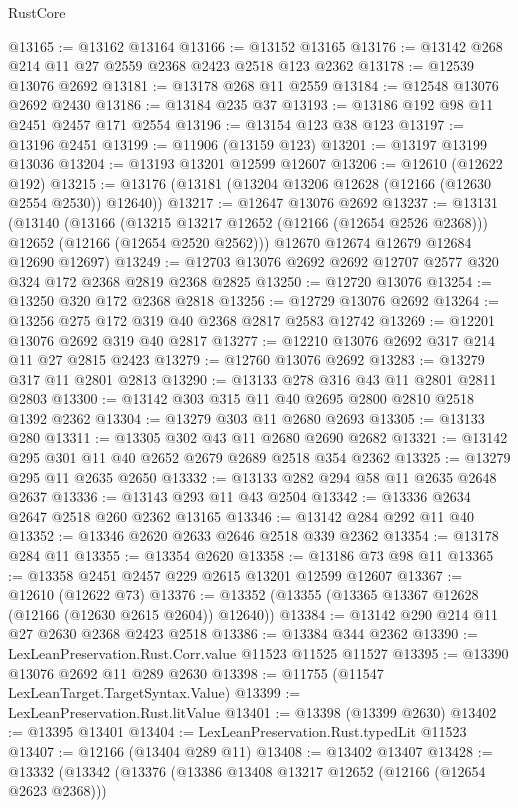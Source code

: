 \begin{lexlean}{RustCore}
\begin{coremodule}
@13165 := @13162 @13164
@13166 := @13152 @13165
@13176 := @13142 @268 @214 @11 @27 @2559 @2368 @2423 @2518 @123 @2362
@13178 := @12539 @13076 @2692
@13181 := @13178 @268 @11 @2559
@13184 := @12548 @13076 @2692 @2430
@13186 := @13184 @235 @37
@13193 := @13186 @192 @98 @11 @2451 @2457 @171 @2554
@13196 := @13154 @123 @38 @123
@13197 := @13196 @2451
@13199 := @11906 (@13159 @123)
@13201 := @13197 @13199 @13036
@13204 := @13193 @13201 @12599 @12607
@13206 := @12610 (@12622 @192)
@13215 := @13176 (@13181 (@13204 @13206 @12628 (@12166 (@12630 @2554 @2530)) @12640))
@13217 := @12647 @13076 @2692
@13237 := @13131
    (@13140
      (@13166
        (@13215 @13217 @12652 (@12166 (@12654 @2526 @2368)))
        @12652
        (@12166 (@12654 @2520 @2562)))
      @12670
      @12674
      @12679
      @12684
      @12690
      @12697)
@13249 := @12703 @13076 @2692 @2692 @12707 @2577 @320 @324 @172 @2368 @2819 @2368 @2825
@13250 := @12720 @13076
@13254 := @13250 @320 @172 @2368 @2818
@13256 := @12729 @13076 @2692
@13264 := @13256 @275 @172 @319 @40 @2368 @2817 @2583 @12742
@13269 := @12201 @13076 @2692 @319 @40 @2817
@13277 := @12210 @13076 @2692 @317 @214 @11 @27 @2815 @2423
@13279 := @12760 @13076 @2692
@13283 := @13279 @317 @11 @2801 @2813
@13290 := @13133 @278 @316 @43 @11 @2801 @2811 @2803
@13300 := @13142 @303 @315 @11 @40 @2695 @2800 @2810 @2518 @1392 @2362
@13304 := @13279 @303 @11 @2680 @2693
@13305 := @13133 @280
@13311 := @13305 @302 @43 @11 @2680 @2690 @2682
@13321 := @13142 @295 @301 @11 @40 @2652 @2679 @2689 @2518 @354 @2362
@13325 := @13279 @295 @11 @2635 @2650
@13332 := @13133 @282 @294 @58 @11 @2635 @2648 @2637
@13336 := @13143 @293 @11 @43 @2504
@13342 := @13336 @2634 @2647 @2518 @260 @2362 @13165
@13346 := @13142 @284 @292 @11 @40
@13352 := @13346 @2620 @2633 @2646 @2518 @339 @2362
@13354 := @13178 @284 @11
@13355 := @13354 @2620
@13358 := @13186 @73 @98 @11
@13365 := @13358 @2451 @2457 @229 @2615 @13201 @12599 @12607
@13367 := @12610 (@12622 @73)
@13376 := @13352 (@13355 (@13365 @13367 @12628 (@12166 (@12630 @2615 @2604)) @12640))
@13384 := @13142 @290 @214 @11 @27 @2630 @2368 @2423 @2518
@13386 := @13384 @344 @2362
@13390 := LexLeanPreservation.Rust.Corr.value @11523 @11525 @11527
@13395 := @13390 @13076 @2692 @11 @289 @2630
@13398 := @11755 (@11547 LexLeanTarget.TargetSyntax.Value)
@13399 := LexLeanPreservation.Rust.litValue
@13401 := @13398 (@13399 @2630)
@13402 := @13395 @13401
@13404 := LexLeanPreservation.Rust.typedLit @11523
@13407 := @12166 (@13404 @289 @11)
@13408 := @13402 @13407
@13428 := @13332
    (@13342
      (@13376
        (@13386 @13408 @13217 @12652 (@12166 (@12654 @2623 @2368)))

\end{coremodule}
\end{lexlean}
